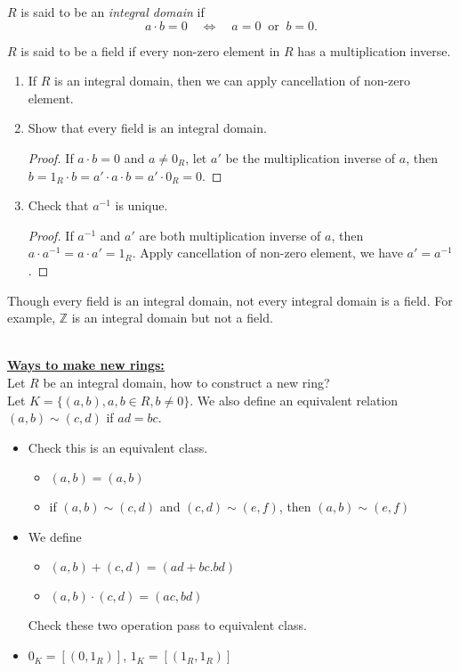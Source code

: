 \begin{definition}
$R$ is said to be an \emph{integral domain}  if 
$$a\cdot b =0\quad\Longleftrightarrow\quad a=0\ \mbox{ or }\ b=0.$$
\end{definition}
\begin{definition}
$R$ is said to be a field if every non-zero element in $R$ has a multiplication inverse.
\end{definition}
\begin{exercise}\mbox{}
\begin{enumerate}
\item If $R$ is an integral domain, then we can apply cancellation of non-zero element.
\item Show that every field is an integral domain.
\begin{proof}
If $a\cdot b = 0$ and $a\neq 0_R$, let $a'$ be the multiplication inverse of $a$, then $b=1_R \cdot b=a'\cdot a\cdot b =a'\cdot0_R=0$.
\end{proof}
\item Check that $a^{-1}$ is unique.
\begin{proof}
If $a^{-1}$ and $a'$ are both multiplication inverse of $a$, then $a\cdot a^{-1} = a\cdot a' =1_R$. Apply cancellation of non-zero element, we have $a' = a^{-1}$.
\end{proof}
\end{enumerate}
\end{exercise}
\begin{remark}Though every field is an integral domain, not every integral domain is a field. For example, $\mathbb{Z}$ is an integral domain but not a field.
\end{remark}\mbox{}\\
\underline{\bfseries Ways to make new rings:}\\[1pt]
Let $R$ be an integral domain, how to construct a new ring?\\
Let $K=\{(a,b), a,b\in R, b\neq 0\}$. We also define an equivalent relation $(a,b)\sim(c,d)$ if $ad=bc$.
\begin{itemize}
\item Check this is an equivalent class.
\begin{itemize}
\item $(a,b)=(a,b)$
\item if $(a,b)\sim (c,d)$ and $(c,d)\sim (e,f)$, then $(a,b)\sim (e,f)$
\end{itemize}
\item We define \begin{itemize}
 \item $(a,b)+(c, d) = (ad+bc. bd)$
 \item $(a,b)\cdot (c,d) = (ac, bd)$
 \end{itemize}
 Check these two operation pass to equivalent class.
\item $0_K=[(0,1_R)]$, $1_K = [(1_R, 1_R)]$
\end{itemize}
